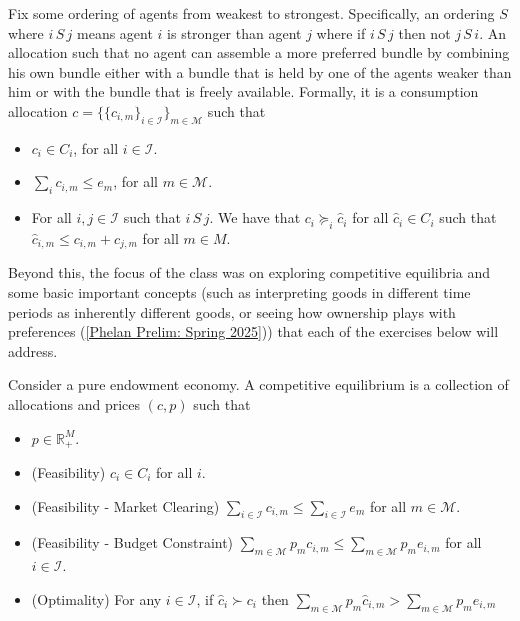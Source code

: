\documentclass[11pt,english]{article}
\begin{document}
\begin{definition}
Fix some ordering of agents from weakest to strongest. Specifically, an ordering $S$ where $i\,S\,j$ means agent $i$ is stronger than agent $j$ where if $i\,S\,j$ then not $j\,S\,i$. An allocation such that no agent can assemble a more preferred bundle by combining his own bundle either with a bundle that is held by one of the agents weaker than him or with the bundle that is freely available. Formally, it is a consumption allocation $c = \{\{c_{i,m}\}_{i\in \mathcal{I}}\}_{m\in \mathcal{M}}$ such that
\begin{itemize}
\item $c_i\in C_i$, for all $i\in \mathcal{I}$.
\item $\sum_i c_{i,m} \leq e_m$, for all $m\in \mathcal{M}$.
\item For all $i,j\in \mathcal{I}$ such that $i\,S\,j$. We have that  $c_i \succeq_i \hat{c}_i$ for all $\hat{c}_i\in C_i$ such that $\hat{c}_{i,m} \leq c_{i,m} + c_{j,m}$ for all $m\in M$.
\end{itemize}
\end{definition}
Beyond this, the focus of the class was on exploring competitive equilibria and some basic important concepts (such as interpreting goods in different time periods as inherently different goods, or seeing how ownership plays with preferences (\ref{Phelan Prelim: Spring 2025})) that each of the exercises below will address.
\begin{definition}
Consider a pure endowment economy. A competitive equilibrium is a collection of allocations and prices $(c,p)$ such that
\begin{itemize}
\item $p\in \mathbb{R}_+^M$.
\item (Feasibility) $c_i\in C_i$ for all $i$.
\item (Feasibility - Market Clearing) $\sum_{i\in \mathcal{I}}c_{i,m} \leq \sum_{i\in \mathcal{I}}e_m$ for all $m\in \mathcal{M}$.
\item (Feasibility - Budget Constraint)  $\sum_{m\in \mathcal{M}} p_m c_{i,m} \leq \sum_{m\in \mathcal{M}} p_m e_{i,m}$ for all $i\in \mathcal{I}$.
\item (Optimality) For any $i\in \mathcal{I}$, if $\hat{c}_i \succ c_i$ then $\sum_{m\in \mathcal{M}} p_m \hat{c}_{i,m} > \sum_{m\in \mathcal{M}} p_m e_{i,m}$
\end{itemize}
\end{definition}
\end{document}
